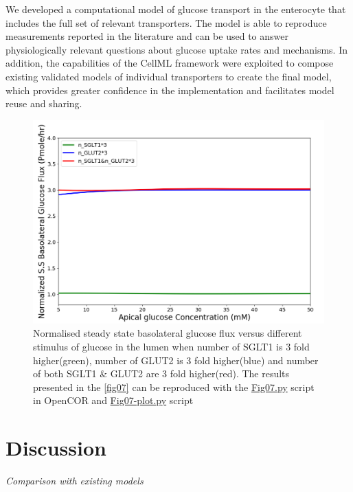 \documentclass[fleqn,10pt]{physiome}
\begin{document}
We developed a computational model of glucose transport in the enterocyte that includes the full set of relevant transporters. The model is able to reproduce measurements reported in the literature and can be used to answer physiologically relevant questions about glucose uptake rates and mechanisms. In addition, the capabilities of the CellML framework were exploited to compose existing validated models of individual transporters to create the final model, which provides greater confidence in the implementation and facilitates model reuse and sharing.
\begin{figure}[H]
\centering
\includegraphics[width=0.8\linewidth]{fig07.png}
\caption{Normalised steady state basolateral glucose flux versus different stimulus of glucose in the  lumen when  number of SGLT1 is 3 fold higher(green), number of GLUT2  is 3 fold higher(blue) and number of both SGLT1 \& GLUT2 are 3 fold higher(red). The results presented in the \autoref{fig07} can be reproduced with the \href{https://models.physiomeproject.org/workspace/572/file/c052b0c460280139dad150937fbee4fa6a026505/SEDML_files/Fig07.py}{Fig07.py} script in OpenCOR and \href{https://models.physiomeproject.org/workspace/572/file/c052b0c460280139dad150937fbee4fa6a026505/SEDML_files/Fig07_plot.py}{Fig07-plot.py} script}
\label{fig07}
\end{figure}

\section{Discussion}

\textit{Comparison with existing models}\newline
\end{document}
